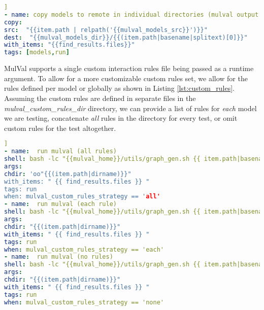\begin{minipage}{.95\linewidth}
\begin{lstlisting}[language=yaml, label={lst:model_dirs}, caption={MulVal distinct run dirs},captionpos=b,  ]]
- name: copy models to remote in individual directories (mulval output is noisy)
copy:
src:  "{{item.path | relpath('{{mulval_models_src}}')}}"
dest:  "{{mulval_models_dir}}/{{(item.path|basename|splitext)[0]}}"
with_items: "{{find_results.files}}"
tags: [models,run]
\end{lstlisting}
\end{minipage}

MulVal supports a single custom interaction rules file being passed as a runtime argument. To allow for a more customizable custom rules set, we allow for the rules defined per model or globally as shown in Listing \ref{lst:custom_rules}. Assuming the custom rules are defined in separate files in the \textit{mulval\_custom\_rules\_dir} directory, we can provide a list of rules for \textit{each} model we are testing, concatenate \textit{all} rules in the directory for every test, or omit custom rules for the test altogether. 

\begin{minipage}{.95\linewidth}
\begin{lstlisting}[language=yaml, label={lst:custom_rules}, caption={MulVal custom rule strategies},captionpos=b,]]
- name:  run mulval (all rules)
shell: bash -lc "{{mulval_home}}/utils/graph_gen.sh {{ item.path|basename }} -p -v -a {{mulval_custom_rules_dir}}/custom_rules.P "
args:
chdir: 'oo"{{(item.path|dirname)}}"
with_items: " {{ find_results.files }} "
tags: run
when: mulval_custom_rules_strategy == 'all'
- name:  run mulval (each rule)
shell: bash -lc "{{mulval_home}}/utils/graph_gen.sh {{ item.path|basename }} -p -v -a {{mulval_custom_rules_dir}}/{{ item.path|basename }}.rules  "
args:
chdir: "{{(item.path|dirname)}}"
with_items: " {{ find_results.files }} "
tags: run
when: mulval_custom_rules_strategy == 'each'
- name:  run mulval (no rules)
shell: bash -lc "{{mulval_home}}/utils/graph_gen.sh {{ item.path|basename }} -p -v"
args:
chdir: "{{(item.path|dirname)}}"
with_items: " {{ find_results.files }} "
tags: run
when: mulval_custom_rules_strategy == 'none'
\end{lstlisting}
\end{minipage}

